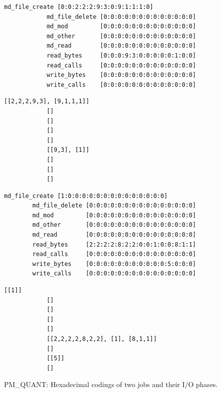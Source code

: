 \documentclass{jhps}
\begin{document}
\begin{listing}
	\noindent\begin{minipage}{\textwidth}
		\noindent\begin{minipage}{0.6\textwidth}
			\begin{lstlisting}[basicstyle=\fontsize{8}{8}\ttfamily]
			md_file_create [0:0:2:2:2:9:3:0:9:1:1:1:0]
			md_file_delete [0:0:0:0:0:0:0:0:0:0:0:0:0]
			md_mod         [0:0:0:0:0:0:0:0:0:0:0:0:0]
			md_other       [0:0:0:0:0:0:0:0:0:0:0:0:0]
			md_read        [0:0:0:0:0:0:0:0:0:0:0:0:0]
			read_bytes     [0:0:0:9:3:0:0:0:0:0:1:0:0]
			read_calls     [0:0:0:0:0:0:0:0:0:0:0:0:0]
			write_bytes    [0:0:0:0:0:0:0:0:0:0:0:0:0]
			write_calls    [0:0:0:0:0:0:0:0:0:0:0:0:0]
			\end{lstlisting}
			\vspace{-2em}
			\label{lst:sim:pm_quant:job_a}
		\end{minipage}
		\noindent\begin{minipage}{0.39\textwidth}
			\begin{lstlisting}[basicstyle=\fontsize{8}{8}\ttfamily]
			[[2,2,2,9,3], [9,1,1,1]]
			[]
			[]
			[]
			[]
			[[9,3], [1]]
			[]
			[]
			[]
			\end{lstlisting}
			\vspace{-2em}
			\label{lst:sim:pm_quant:phases:job_a}
		\end{minipage}
	\end{minipage}
	\noindent\begin{minipage}{\textwidth}
		\noindent\begin{minipage}{0.60\textwidth}
		\begin{lstlisting}[basicstyle=\fontsize{8}{8}\ttfamily]
		md_file_create [1:0:0:0:0:0:0:0:0:0:0:0:0:0:0]
		md_file_delete [0:0:0:0:0:0:0:0:0:0:0:0:0:0:0]
		md_mod         [0:0:0:0:0:0:0:0:0:0:0:0:0:0:0]
		md_other       [0:0:0:0:0:0:0:0:0:0:0:0:0:0:0]
		md_read        [0:0:0:0:0:0:0:0:0:0:0:0:0:0:0]
		read_bytes     [2:2:2:2:8:2:2:0:0:1:0:0:8:1:1]
		read_calls     [0:0:0:0:0:0:0:0:0:0:0:0:0:0:0]
		write_bytes    [0:0:0:0:0:0:0:0:0:0:0:5:0:0:0]
		write_calls    [0:0:0:0:0:0:0:0:0:0:0:0:0:0:0]
		\end{lstlisting}
		\vspace{-2em}
		\label{lst:sim:pm_quant:job_b}
		\end{minipage}
		\noindent\begin{minipage}{0.39\textwidth}
			\begin{lstlisting}[basicstyle=\fontsize{8}{8}\ttfamily]
			[[1]]
			[]
			[]
			[]
			[]
			[[2,2,2,2,8,2,2], [1], [8,1,1]]
			[]
			[[5]]
			[]
			\end{lstlisting}
			\vspace{-2em}
			\label{lst:sim:pm_quant:phases:job_b}
		\end{minipage}
	\end{minipage}
	\caption{PM\_QUANT: Hexadecimal codings of two jobs and their I/O phases.}
	\label{lst:sim:pm_quant}
\end{listing}
\end{document}
